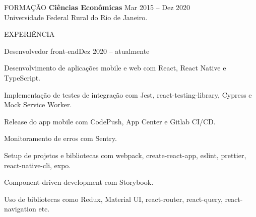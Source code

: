 \documentclass{resume}
\begin{document}

\begin{rSection}{FORMAÇÃO}
  {\bf Ciências Econômicas} \hfill {Mar 2015 -- Dez  2020}
  \\
  Universidade Federal Rural do Rio de Janeiro.
  \\
\end{rSection}


\begin{rSection}{EXPERIÊNCIA}
  \begin{rSubsection}{Desenvolvedor front-end}{Dez 2020 -- atualmente}{}
  \item
  \item Desenvolvimento de aplicações mobile e web com React, React Native e
    TypeScript.
  \item Implementação de testes de integração com Jest, react-testing-library,
    Cypress e Mock Service Worker.
  \item Release do app mobile com CodePush, App Center e Gitlab CI/CD.
  \item Monitoramento de erros com Sentry.
  \item Setup de projetos e bibliotecas com webpack, create-react-app, eslint,
    prettier, react-native-cli, expo.
  \item Component-driven development com Storybook.
  \item Uso de bibliotecas como Redux, Material UI, react-router, react-query,
    react-navigation etc.
  \vspace{5mm}
  \end{rSubsection}
\end{rSection}

\end{document}
